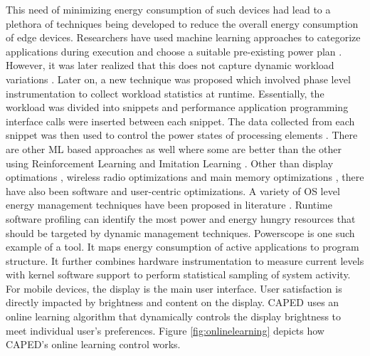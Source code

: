 This need of minimizing energy consumption of such devices had lead to a plethora of techniques being developed to 
reduce the overall energy consumption of edge devices. Researchers have used machine learning approaches to 
categorize applications during execution and choose a suitable pre-existing power plan \cite{power,7851469,4838819}. 
However, it was later realized that this does not capture dynamic workload variations \cite{5751506}. Later on, a new 
technique was proposed which involved phase level instrumentation to collect workload statistics at runtime. Essentially, 
the workload was divided into snippets and performance application programming interface calls were inserted between 
each snippet. The data collected from each snippet was then used to control the power states of processing elements \cite{dypo}. 
There are other ML based approaches as well where some are better than the other using Reinforcement Learning and 
Imitation Learning \cite{7092630,7163527,8449105,8607043,DBLP:journals/corr/abs-1011-0686,7934357,8770273}. Other than 
display optimations \cite{7544394,Dong2009PowersavingCT,187123}, wireless radio optimizations \cite{enloc,ener,min,delay,194920,180309} and 
main memory optimizations \cite{7266864}, there have also been software and user-centric optimizations. A variety of 
OS level energy management techniques have been  proposed in literature \cite{erdos,mob}. Runtime software profiling 
can identify the most power and energy hungry resources that should be targeted by dynamic management techniques. 
Powerscope \cite{powerscope} is one such example of a tool. It maps energy consumption of active applications to program 
structure. It further combines hardware instrumentation to measure current levels with kernel software support to 
perform statistical sampling of system activity. For mobile devices, the display is the main user interface. User 
satisfaction is directly impacted by brightness and content on the display. CAPED \cite{6972472} uses an online 
learning algorithm that dynamically controls the display brightness to meet individual user's preferences. Figure 
\ref{fig:onlinelearning} depicts how CAPED's online learning control works. \\

